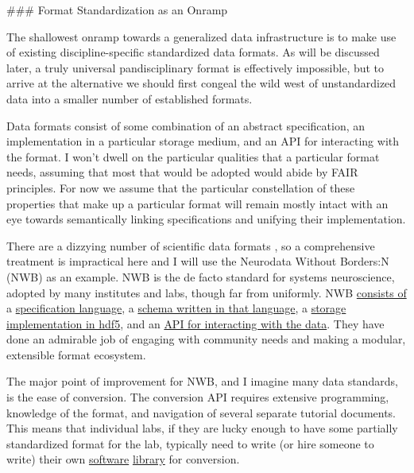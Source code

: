 \documentclass[10pt]{article}
\begin{document}
\begin{multicols}{2}
 \#\#\# Format Standardization as an Onramp

The shallowest onramp towards a generalized data infrastructure is to
make use of existing discipline-specific standardized data formats. As
will be discussed later, a truly universal pandisciplinary format is
effectively impossible, but to arrive at the alternative we should first
congeal the wild west of unstandardized data into a smaller number of
established formats.

Data formats consist of some combination of an abstract specification,
an implementation in a particular storage medium, and an API for
interacting with the format. I won't dwell on the particular qualities
that a particular format needs, assuming that most that would be adopted
would abide by FAIR principles. For now we assume that the particular
constellation of these properties that make up a particular format will
remain mostly intact with an eye towards semantically linking
specifications and unifying their implementation.

There are a dizzying number of scientific data formats \cite{teamScientificDataFormats} , so a comprehensive treatment is
impractical here and I will use the Neurodata Without Borders:N
(NWB)\cite{rubelNWBAccessibleData2019a}  as an example. NWB is
the de facto standard for systems neuroscience, adopted by many
institutes and labs, though far from uniformly. NWB
\href{https://www.nwb.org/nwb-software/}{consists of} a
\href{https://schema-language.readthedocs.io/en/stable/}{specification
language}, a \href{https://nwb-schema.readthedocs.io/en/stable/}{schema
written in that language}, a
\href{https://nwb-storage.readthedocs.io/en/stable/}{storage
implementation in hdf5}, and an
\href{https://pynwb.readthedocs.io/en/stable/}{API for interacting with
the data}. They have done an admirable job of engaging with community
needs \cite{rubelNeurodataBordersEcosystem2021}  and making a
modular, extensible format ecosystem.

The major point of improvement for NWB, and I imagine many data
standards, is the ease of conversion. The conversion API requires
extensive programming, knowledge of the format, and navigation of
several separate tutorial documents. This means that individual labs, if
they are lucky enough to have some partially standardized format for the
lab, typically need to write (or hire someone to write) their own
\href{https://github.com/catalystneuro/tank-lab-to-nwb}{software}
\href{https://github.com/catalystneuro/mease-lab-to-nwb}{library} for
conversion.


\end{multicols}
\end{document}
